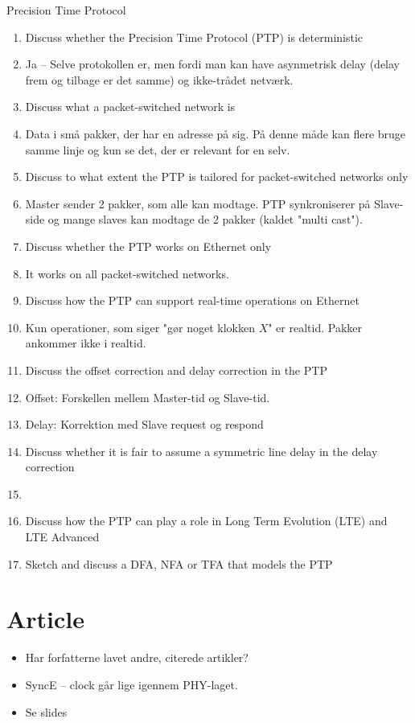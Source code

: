 \documentclass[oneside, 10pt]{article}
\begin{document}
Precision Time Protocol
\begin{enumerate}
	\item Discuss whether the Precision Time Protocol (PTP) is deterministic
	\item[] Ja -- Selve protokollen er, men fordi man kan have asynmetrisk delay (delay frem og tilbage er det samme) og ikke-trådet netværk.

	\item Discuss what a packet-switched network is
	\item[]  Data i små pakker, der har en adresse på sig. 
	På denne måde kan flere bruge samme linje og kun se det, der er relevant for en selv.

	\item  Discuss to what extent the PTP is tailored for packet-switched networks only
	\item[] Master sender 2 pakker, som alle kan modtage. 
	PTP synkroniserer på Slave-side og mange slaves kan modtage de 2 pakker (kaldet "multi cast").

	\item Discuss whether the PTP works on Ethernet only
	\item[] It works on all packet-switched networks.

	\item Discuss how the PTP can support real-time operations on Ethernet
	\item[] Kun operationer, som siger "gør noget klokken $X$" er realtid.
	Pakker ankommer ikke i realtid. 

	\item Discuss the offset correction and delay correction in the PTP
	\item[] Offset: Forskellen mellem Master-tid og Slave-tid.
	\item[] Delay: Korrektion med Slave request og respond

	\item Discuss whether it is fair to assume a symmetric line delay in the delay correction
	\item[]

	\item Discuss how the PTP can play a role in Long Term Evolution (LTE) and LTE Advanced
	\item Sketch and discuss a DFA, NFA or TFA that models the PTP
\end{enumerate}

\section{Article}
\begin{itemize}
	\item Har forfatterne lavet andre, citerede artikler?
	\item SyncE -- clock går lige igennem PHY-laget.
	\item Se slides
\end{itemize}
\end{document}

